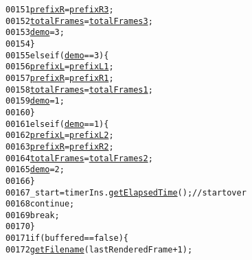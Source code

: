 \begin{footnotesize}
\begin{alltt}
00151                                 \hyperlink{config_8h_a939852ed72b1f29dd46c267ba1894687}{prefixR} = \hyperlink{config_8h_ad994e29c70b4b20e5aa11c462d2eaa23}{prefixR3};
00152                                 \hyperlink{config_8h_a0186bee82f4d469206cfcb18da843a46}{totalFrames} = \hyperlink{config_8h_a4058af0c43622045689a17dbf546a095}{totalFrames3};
00153                                 \hyperlink{config_8h_a64af52e30206638c00ad08ee8894e3c8}{demo} = 3;
00154                         \}
00155                         \textcolor{keywordflow}{else} \textcolor{keywordflow}{if}(\hyperlink{config_8h_a64af52e30206638c00ad08ee8894e3c8}{demo} == 3)\{
00156                                 \hyperlink{config_8h_a6082de4d3555d07a84270f7bacac9a63}{prefixL} = \hyperlink{config_8h_a5cfb7ac53a84ac65db638d7926c1216b}{prefixL1};
00157                                 \hyperlink{config_8h_a939852ed72b1f29dd46c267ba1894687}{prefixR} = \hyperlink{config_8h_a0cc8c7e0d207c825f13d92d52480abfc}{prefixR1};
00158                                 \hyperlink{config_8h_a0186bee82f4d469206cfcb18da843a46}{totalFrames} = \hyperlink{config_8h_a1daaec6dd86a744de60951adc0d7491c}{totalFrames1};
00159                                 \hyperlink{config_8h_a64af52e30206638c00ad08ee8894e3c8}{demo} = 1;
00160                         \}
00161                         \textcolor{keywordflow}{else} \textcolor{keywordflow}{if}(\hyperlink{config_8h_a64af52e30206638c00ad08ee8894e3c8}{demo} == 1)\{
00162                                 \hyperlink{config_8h_a6082de4d3555d07a84270f7bacac9a63}{prefixL} = \hyperlink{config_8h_ad2536ccefd202465bc9de3185f689385}{prefixL2};
00163                                 \hyperlink{config_8h_a939852ed72b1f29dd46c267ba1894687}{prefixR} = \hyperlink{config_8h_a655684630849cbc78a1a701627a5be79}{prefixR2};
00164                                 \hyperlink{config_8h_a0186bee82f4d469206cfcb18da843a46}{totalFrames} = \hyperlink{config_8h_a30f8e88254cae72861ca9f1082036f13}{totalFrames2};
00165                                 \hyperlink{config_8h_a64af52e30206638c00ad08ee8894e3c8}{demo} = 2;
00166                         \}
00167                         \_start = timerIns.\hyperlink{class_my_timer_abd0f6728cf64f7b5d81235588bb8e3c2}{getElapsedTime}(); \textcolor{comment}{// start over}
00168                         \textcolor{keywordflow}{continue};
00169                         \textcolor{keywordflow}{break};
00170                 \}
00171                 \textcolor{keywordflow}{if}(buffered==\textcolor{keyword}{false}) \{
00172                         \hyperlink{main_8cpp_a6deb2598e68338891c9b1faadea263b9}{getFilename}(lastRenderedFrame+1);

\end{alltt}
\end{footnotesize}
